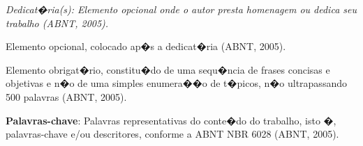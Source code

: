 \cleardoublepage
\thispagestyle{empty}
\vspace*{200mm}

\begin{flushright}
{\em 
Dedicat�ria(s): Elemento opcional onde o autor presta homenagem ou dedica seu trabalho (ABNT, 2005).
}
\end{flushright}
\newpage


\hspace{5mm}
Elemento opcional, colocado ap�s a dedicat�ria (ABNT, 2005). 

\begin{resumo}

Elemento obrigat�rio, constitu�do de uma sequ�ncia de frases concisas e objetivas e n�o de uma simples enumera��o de t�picos, n�o ultrapassando 500 palavras (ABNT, 2005).

{\hspace{-8mm} \bf{Palavras-chave}}: Palavras representativas do conte�do do trabalho, isto �, palavras-chave e/ou descritores, conforme a ABNT NBR 6028 (ABNT, 2005).

\end{resumo}

\begin{abstract}

Elemento obrigat�rio, em l�ngua estrangeira, com as mesmas caracter�sticas do resumo em l�ngua vern�cula (ABNT, 2005).

{\hspace{-8mm} \bf{Keywords}}: Palavras representativas do conte�do do trabalho, isto �, palavras-chave e/ou descritores, na l�ngua (ABNT, 2005).

\end{abstract}

\listoffigures


